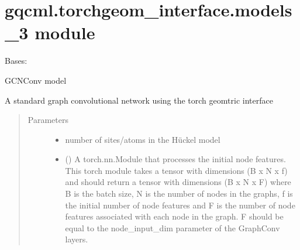 \documentclass[letterpaper,10pt,english]{sphinxmanual}
\begin{document}
\section{gqcml.torchgeom\_interface.models\_3 module}
\label{\detokenize{modules/gqcml.torchgeom_interface:module-gqcml.torchgeom_interface.models_3}}\label{\detokenize{modules/gqcml.torchgeom_interface:gqcml-torchgeom-interface-models-3-module}}

\begin{fulllineitems}
\label{\detokenize{modules/gqcml.torchgeom_interface:gqcml.torchgeom_interface.models_3.GCNConv}}
Bases: 

GCNConv model

A standard graph convolutional network using the torch geomtric interface
\begin{quote}\begin{description}
\item[{Parameters}] \leavevmode\begin{itemize}
\item {} 
 \textendash{} number of sites/atoms in the Hückel model

\item {} 
 () \textendash{} A torch.nn.Module that processes the initial node features. This torch module
takes a tensor with dimensions (B x N x f)  and should return a tensor with
dimensions (B x N x F) where B is the batch size, N is the number of nodes in
the graphs, f is the initial number of node features and F is the number of node features
associated with each node in the graph. F should be equal to the node\_input\_dim
parameter of the GraphConv layers.


\end{itemize}
\end{description}
\end{quote}
\end{fulllineitems}
\end{document}
